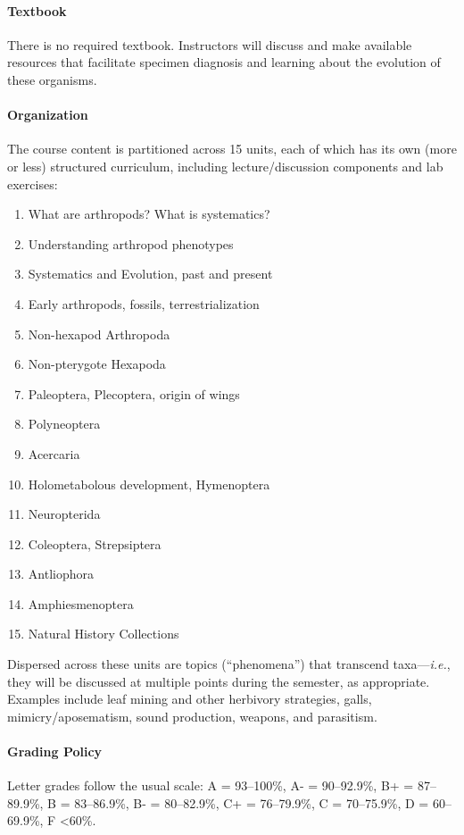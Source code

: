 \documentclass[11pt]{article}
\begin{document}
\paragraph{Textbook} 
There is no required textbook. Instructors will discuss and make available resources that facilitate specimen diagnosis and learning about the evolution of these organisms.

\paragraph{Organization}
The course content is partitioned across 15 units, each of which has its own (more or less) structured curriculum, including lecture/discussion components and lab exercises:

\begin{enumerate}
\item What are arthropods? What is systematics?
\item Understanding arthropod phenotypes
\item Systematics and Evolution, past and present
\item Early arthropods, fossils, terrestrialization 
\item Non-hexapod Arthropoda
\item Non-pterygote Hexapoda
\item Paleoptera, Plecoptera, origin of wings
\item Polyneoptera
\item Acercaria
\item Holometabolous development, Hymenoptera
\item Neuropterida
\item Coleoptera, Strepsiptera
\item Antliophora
\item Amphiesmenoptera
\item Natural History Collections
\end{enumerate}

\noindent{}Dispersed across these units are topics (``phenomena'') that transcend taxa---\textit{i.e.}, they will be discussed at multiple points during the semester, as appropriate. Examples include leaf mining and other herbivory strategies, galls, mimicry/aposematism, sound production, weapons, and parasitism.

\paragraph{Grading Policy} Letter grades follow the usual scale: A = 93--100\%, A- = 90--92.9\%, B+ = 87--89.9\%, B = 83--86.9\%, B- = 80--82.9\%, C+ = 76--79.9\%, C = 70--75.9\%, D = 60--69.9\%, F \textless 60\%.
\end{document}
